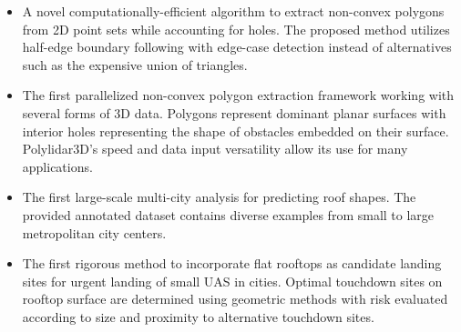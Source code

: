 \begin{itemize}[noitemsep]
      \item A novel computationally-efficient algorithm to extract non-convex polygons from 2D point sets while accounting for holes. The proposed method utilizes half-edge boundary following with edge-case detection instead of alternatives such as the expensive union of triangles.
      \item The first parallelized non-convex polygon extraction framework working with several forms of 3D data. Polygons represent dominant planar surfaces with interior holes representing the shape of obstacles embedded on their surface. Polylidar3D's speed and data input versatility allow its use for many applications.
      \item The first large-scale multi-city analysis for predicting roof shapes. The provided annotated dataset contains diverse examples from small to large metropolitan city centers. 
      \item The first rigorous method to incorporate flat rooftops as candidate landing sites for urgent landing of small UAS in cities.  Optimal touchdown sites on rooftop surface are determined using geometric methods with risk evaluated according to size and proximity to alternative touchdown sites.
\end{itemize}







